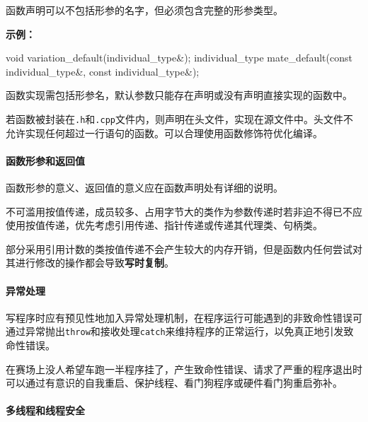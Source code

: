 \documentclass[
]{article}
\newenvironment{Shaded}{}{}
\newcommand{\AttributeTok}[1]{\textcolor[rgb]{0.49,0.56,0.16}{#1}}
\newcommand{\DataTypeTok}[1]{\textcolor[rgb]{0.56,0.13,0.00}{#1}}
\newcommand{\NormalTok}[1]{#1}
\newcommand{\OperatorTok}[1]{\textcolor[rgb]{0.40,0.40,0.40}{#1}}
\begin{document}
函数声明可以不包括形参的名字，但必须包含完整的形参类型。

\textbf{示例：}

\begin{Shaded}
\begin{Highlighting}[]
\DataTypeTok{void}\NormalTok{ variation\_default}\OperatorTok{(}\DataTypeTok{individual\_type}\OperatorTok{\&);}
\DataTypeTok{individual\_type}\NormalTok{ mate\_default}\OperatorTok{(}\AttributeTok{const} \DataTypeTok{individual\_type}\OperatorTok{\&,} \AttributeTok{const} \DataTypeTok{individual\_type}\OperatorTok{\&);}
\end{Highlighting}
\end{Shaded}

函数实现需包括形参名，默认参数只能存在声明或没有声明直接实现的函数中。

若函数被封装在\texttt{.h}和\texttt{.cpp}文件内，则声明在头文件，实现在源文件中。头文件不允许实现任何超过一行语句的函数。可以合理使用函数修饰符优化编译。

\hypertarget{ux51fdux6570ux5f62ux53c2ux548cux8fd4ux56deux503c}{%
\paragraph{函数形参和返回值}\label{ux51fdux6570ux5f62ux53c2ux548cux8fd4ux56deux503c}}

函数形参的意义、返回值的意义应在函数声明处有详细的说明。

不可滥用按值传递，成员较多、占用字节大的类作为参数传递时若非迫不得已不应使用按值传递，优先考虑引用传递、指针传递或传递其代理类、句柄类。

部分采用引用计数的类按值传递不会产生较大的内存开销，但是函数内任何尝试对其进行修改的操作都会导致\textbf{写时复制}。

\hypertarget{ux5f02ux5e38ux5904ux7406}{%
\paragraph{异常处理}\label{ux5f02ux5e38ux5904ux7406}}

写程序时应有预见性地加入异常处理机制，在程序运行可能遇到的非致命性错误可通过异常抛出\texttt{throw}和接收处理\texttt{catch}来维持程序的正常运行，以免真正地引发致命性错误。

在赛场上没人希望车跑一半程序挂了，产生致命性错误、请求了严重的程序退出时可以通过有意识的自我重启、保护线程、看门狗程序或硬件看门狗重启弥补。

\hypertarget{ux591aux7ebfux7a0bux548cux7ebfux7a0bux5b89ux5168}{%
\paragraph{多线程和线程安全}\label{ux591aux7ebfux7a0bux548cux7ebfux7a0bux5b89ux5168}}
\end{document}
